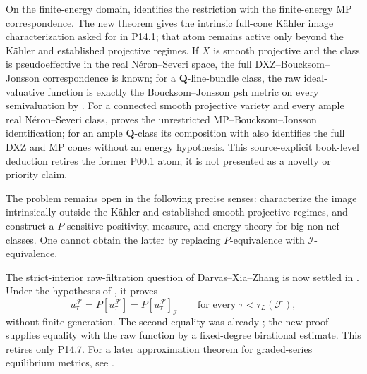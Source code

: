 On the finite-energy domain,
 identifies the restriction with the
finite-energy MP correspondence.  The new theorem gives the intrinsic
full-cone K\"ahler image characterization asked for in P14.1; that atom
remains active only beyond the K\"ahler and established projective regimes.
If \(X\) is smooth projective and
the class is pseudoeffective
in the real N\'eron--Severi space, the full DXZ--Boucksom--Jonsson
correspondence is known; for a \(\mathbf Q\)-line-bundle class, the raw
ideal-valuative function is exactly the Boucksom--Jonsson psh metric on
every semivaluation by \cite[formula~(3.8) and Theorem~3.12]{Xia23Operations}.
For a connected smooth projective variety and every ample real
N\'eron--Severi class,  proves the
unrestricted MP--Boucksom--Jonsson identification; for an ample
\(\mathbf Q\)-class its composition with \cite[Theorem~3.14]{DXZ23}
also identifies the full DXZ and MP cones without an energy hypothesis.
This source-explicit book-level deduction retires the former P00.1 atom;
it is not presented as a novelty or priority claim.

The problem remains open in the following precise senses: characterize the
image intrinsically outside the K\"ahler and established smooth-projective
regimes, and construct a \(P\)-sensitive positivity, measure, and energy
theory for big non-nef classes.  One cannot obtain the latter by replacing
\(P\)-equivalence with \(\mathcal I\)-equivalence.

The strict-interior raw-filtration question of Darvas--Xia--Zhang is now
settled in .  Under the hypotheses of
\cite[Definition~4.1]{DXZ23}, it proves
\[
 u_\tau^{\mathcal F}
 =P[u_\tau^{\mathcal F}]
 =P[u_\tau^{\mathcal F}]_{\mathcal I}
 \qquad\text{for every }\tau<\tau_L(\mathcal F),
\]
without finite generation.  The second equality was already
\cite[Lemma~4.5]{DXZ23}; the new proof supplies equality with the raw
function by a fixed-degree birational estimate.  This retires only P14.7.
For a later approximation theorem for graded-series equilibrium metrics,
see \cite[Theorem~4.3]{Finski26Kodaira}.

